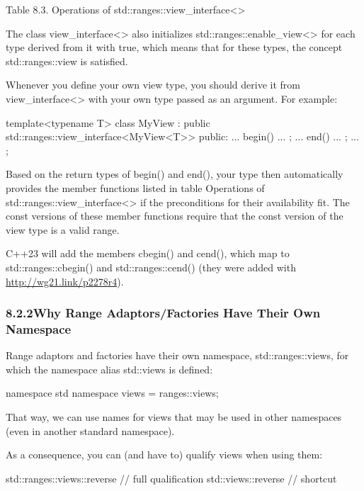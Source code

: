\begin{center}
Table 8.3. Operations of std::ranges::view\_interface<>
\end{center}

The class view\_interface<> also initializes std::ranges::enable\_view<> for each type derived from it with true, which means that for these types, the concept std::ranges::view is satisfied.

Whenever you define your own view type, you should derive it from view\_interface<> with your own type passed as an argument. For example:

\begin{cpp}
template<typename T>
class MyView : public std::ranges::view_interface<MyView<T>> {
	public:
	... begin() ... ;
	... end() ... ;
	...
};
\end{cpp}

Based on the return types of begin() and end(), your type then automatically provides the member functions listed in table Operations of std::ranges::view\_interface<> if the preconditions for their availability fit. The const versions of these member functions require that the const version of the view type is a valid range.

C++23 will add the members cbegin() and cend(), which map to std::ranges::cbegin() and std::ranges::cend() (they were added with \url{http://wg21.link/p2278r4}).

\subsubsection*{ 8.2.2\hspace{0.2cm}Why Range Adaptors/Factories Have Their Own Namespace}

Range adaptors and factories have their own namespace, std::ranges::views, for which the namespace alias std::views is defined:

\begin{cpp}
namespace std {
	namespace views = ranges::views;
}
\end{cpp}

That way, we can use names for views that may be used in other namespaces (even in another standard namespace).

As a consequence, you can (and have to) qualify views when using them:

\begin{cpp}
std::ranges::views::reverse // full qualification
std::views::reverse // shortcut
\end{cpp}

